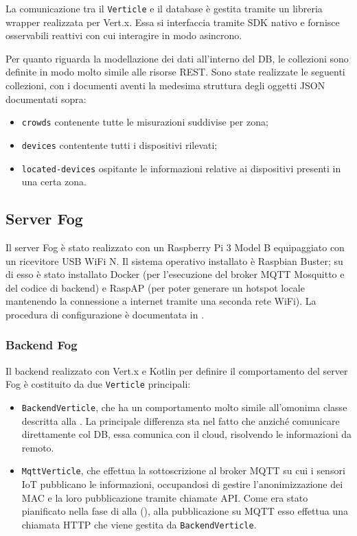 La comunicazione tra il \texttt{Verticle} e il database è gestita tramite un libreria wrapper realizzata per Vert.x.
Essa si interfaccia tramite SDK nativo e fornisce osservabili reattivi con cui interagire in modo asincrono.

Per quanto riguarda la modellazione dei dati all'interno del DB, le collezioni sono definite in modo molto simile alle risorse REST\@.
Sono state realizzate le seguenti collezioni, con i documenti aventi la medesima struttura degli oggetti JSON documentati sopra:

\begin{itemize}
  \item \texttt{crowds} contenente tutte le misurazioni suddivise per zona;
  \item \texttt{devices} contentente tutti i dispositivi rilevati;
  \item \texttt{located-devices} ospitante le informazioni relative ai dispositivi presenti in una certa zona.
\end{itemize}

\subsection{Server Fog}

Il server Fog è stato realizzato con un Raspberry Pi 3 Model B equipaggiato con un ricevitore USB WiFi N.
Il sistema operativo installato è Raspbian Buster; su di esso è stato installato Docker (per l'esecuzione del broker MQTT Mosquitto e del codice di backend) e RaspAP (per poter generare un hotspot locale mantenendo la connessione a internet tramite una seconda rete WiFi).
La procedura di configurazione è documentata in .

\subsubsection{Backend Fog}

Il backend realizzato con Vert.x e Kotlin per definire il comportamento del server Fog è costituito da due \texttt{Verticle} principali:

\begin{itemize}
  \item
    \texttt{BackendVerticle}, che ha un comportamento molto simile all'omonima classe descritta alla .
    La principale differenza sta nel fatto che anziché comunicare direttamente col DB, essa comunica con il cloud, risolvendo le informazioni da remoto.
  \item
    \texttt{MqttVerticle}, che effettua la sottoscrizione al broker MQTT su cui i sensori IoT pubblicano le informazioni, occupandosi di gestire l'anonimizzazione dei MAC e la loro pubblicazione tramite chiamate API\@.
    Come era stato pianificato nella fase di  alla  (), alla pubblicazione su MQTT esso effettua una chiamata HTTP che viene gestita da \texttt{BackendVerticle}.
\end{itemize}

